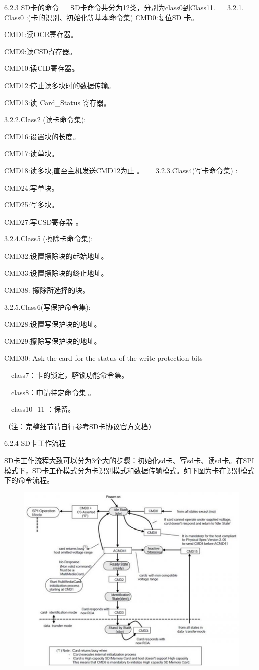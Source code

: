 6.2.3 SD卡的命令
　
SD卡命令共分为12类，分别为class0到Class11.
　
3.2.1. Class0 :(卡的识别、初始化等基本命令集)
CMD0:复位SD 卡。

CMD1:读OCR寄存器。

CMD9:读CSD寄存器。

CMD10:读CID寄存器。

CMD12:停止读多块时的数据传输。

CMD13:读 Card_Status 寄存器。

3.2.2.Class2 (读卡命令集):

CMD16:设置块的长度。

CMD17:读单块。

CMD18:读多块,直至主机发送CMD12为止 。
　
3.2.3.Class4(写卡命令集) :

CMD24:写单块。

CMD25:写多块。

CMD27:写CSD寄存器 。

3.2.4.Class5 (擦除卡命令集):

CMD32:设置擦除块的起始地址。

CMD33:设置擦除块的终止地址。

CMD38: 擦除所选择的块。


3.2.5.Class6(写保护命令集):

CMD28:设置写保护块的地址。

CMD29:擦除写保护块的地址。

CMD30: Ask the card for the status of the write protection bits

　class7：卡的锁定，解锁功能命令集。

　class8：申请特定命令集 。

　class10 -11 ：保留。

（注：完整细节请自行参考SD卡协议官方文档）

6.2.4 SD卡工作流程

SD卡工作流程大致可以分为3个大的步骤：初始化sd卡、写sd卡、读sd卡。在SPI模式下，SD卡工作模式分为卡识别模式和数据传输模式。如下图为卡在识别模式下的命令流程。

\begin{figure}[H]
    \centering
    \includegraphics{figures/06-02-命令流程.png}
\end{figure}

